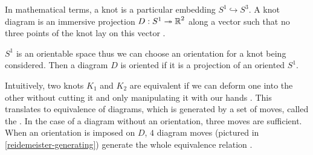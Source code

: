 In mathematical terms, a knot is a particular embedding $S^1\hookrightarrow S^3$. A knot diagram is an {immersive projection} $D:S^1\twoheadrightarrow \operatorname{\mathbb{R}}^2$ along a vector such that no three points of the knot lay on this vector \cite{likorish-diagram}.

$S^1$ is an orientable space thus we can choose an orientation for a knot being considered. Then a diagram $D$ is oriented if it is a projection of an oriented $S^1$.

Intuitively, two knots $K_1$ and $K_2$ are equivalent if we can deform one into the other without cutting it and only manipulating it with our hands \cite{murasagi-equivalence}. This translates to equivalence of diagrams, which is generated by a set of moves, called the . In the case of a diagram without an orientation, three moves are sufficient. When an orientation is imposed on $D$, $4$ diagram moves (pictured in \cref{reidemeister-generating}) generate the whole equivalence relation \cite{ruchy_zorientowane}.

